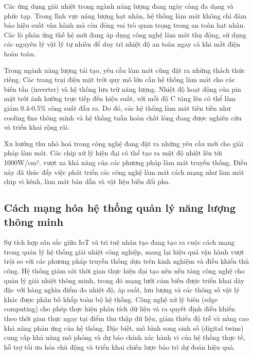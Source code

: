 \documentclass[../main.tex]{subfiles}
\begin{document}
Các ứng dụng giải nhiệt trong ngành năng lượng đang ngày càng đa dạng và phức tạp. Trong lĩnh vực năng lượng hạt nhân, hệ thống làm mát không chỉ đảm bảo hiệu suất vận hành mà còn đóng vai trò quan trọng trong an toàn hạt nhân. Các lò phản ứng thế hệ mới đang áp dụng công nghệ làm mát thụ động, sử dụng các nguyên lý vật lý tự nhiên để duy trì nhiệt độ an toàn ngay cả khi mất điện hoàn toàn.

Trong ngành năng lượng tái tạo, yêu cầu làm mát cũng đặt ra những thách thức riêng. Các trang trại điện mặt trời quy mô lớn cần hệ thống làm mát cho các biến tần (inverter) và hệ thống lưu trữ năng lượng. Nhiệt độ hoạt động của pin mặt trời ảnh hưởng trực tiếp đến hiệu suất, với mỗi độ C tăng lên có thể làm giảm 0.4-0.5\% công suất đầu ra. Do đó, các hệ thống làm mát tiên tiến như cooling fins thông minh và hệ thống tuần hoàn chất lỏng đang được nghiên cứu và triển khai rộng rãi.

Xu hướng thu nhỏ hoá trong công nghệ đang đặt ra những yêu cầu mới cho giải pháp làm mát. Các chip xử lý hiện đại có thể tạo ra mật độ nhiệt lên tới 1000W/cm², vượt xa khả năng của các phương pháp làm mát truyền thống. Điều này đã thúc đẩy việc phát triển các công nghệ làm mát cách mạng như làm mát chip vi kênh, làm mát bán dẫn và vật liệu biến đổi pha.

\subsection{Cách mạng hóa hệ thống quản lý năng lượng thông minh}
\label{sec:intelligent_energy_management_revolution}

Sự tích hợp sâu sắc giữa IoT và trí tuệ nhân tạo đang tạo ra cuộc cách mạng trong quản lý hệ thống giải nhiệt công nghiệp, mang lại hiệu quả vận hành vượt trội so với các phương pháp truyền thống dựa trên kinh nghiệm và điều khiển thủ công. Hệ thống giám sát thời gian thực hiện đại tạo nên nền tảng công nghệ cho quản lý giải nhiệt thông minh, trong đó mạng lưới cảm biến được triển khai dày đặc với hàng nghìn điểm đo nhiệt độ, áp suất, lưu lượng và các thông số vật lý khác được phân bố khắp toàn bộ hệ thống. Công nghệ xử lý biên (edge computing) cho phép thực hiện phân tích dữ liệu và ra quyết định điều khiển theo thời gian thực ngay tại điểm thu thập dữ liệu, giảm thiểu độ trễ và nâng cao khả năng phản ứng của hệ thống. Đặc biệt, mô hình song sinh số (digital twins) cung cấp khả năng mô phỏng và dự báo chính xác hành vi của hệ thống thực tế, hỗ trợ tối ưu hóa chủ động và triển khai chiến lược bảo trì dự đoán hiệu quả.
\end{document}
